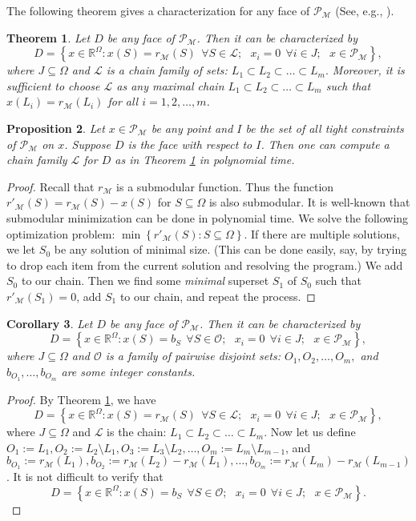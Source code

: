 \documentclass[a4paper,11pt]{article}
\newtheorem{theorem}{Theorem}[section]
\newtheorem{proposition}[theorem]{Proposition}
\newtheorem{corollary}[theorem]{Corollary}
\newcommand{\M}{\mathcal{M}}
\renewcommand{\O}{\mathcal{O}}
\renewcommand{\L}{\mathcal{L}}
\renewcommand{\P}{\mathcal{P}}
\begin{document}
The following theorem gives a characterization for any face of $\P_\M$ (See, e.g., \cite{schrijver, Lau2001}). 
\begin{theorem}
Let $D$ be any face of $\P_\M$. Then it can be characterized by
$$ D = \left\{x \in \mathbb{R}^{\Omega}: x(S) = r_\M(S)~~\forall S \in \L; ~~~ x_i = 0 ~~\forall i \in J; ~~~ x \in \P_\M  \right\},$$
where $J \subseteq \Omega$ and $\L$ is a chain family of sets:
$L_1 \subset L_2 \subset \ldots \subset L_m.$ Moreover, it is sufficient to choose $\L$ as any maximal chain $L_1 \subset L_2 \subset \ldots \subset L_m$ such that $x(L_i) = r_\M(L_i)$ for all $i = 1, 2, \ldots, m$.
\label{theorem:decompose_face}
\end{theorem}


\begin{proposition} Let $x \in \P_\M$ be any point and $I$ be the set of all tight constraints of $\P_\M$ on $x$. Suppose $D$ is the face with respect to $I$. Then one can compute a chain family $\L$ for $D$ as in Theorem \ref{theorem:decompose_face} in polynomial time.
\label{prop:decompose_face}
\end{proposition}
\begin{proof} Recall that $r_\M$ is a submodular function. Thus the function $r'_\M(S) = r_\M(S) - x(S)$ for $S \subseteq \Omega$ is also submodular. It is well-known that submodular minimization can be done in polynomial time. We solve the following optimization problem: $\min\left\{r'_\M(S): S \subseteq \Omega \right\}$. If there are multiple solutions, we let $S_0$ be any solution of minimal size. (This can be done easily, say, by trying to drop each item from the current solution and resolving the program.) We add $S_0$ to our chain. Then we find some \emph{minimal} superset $S_1$ of $S_0$ such that $r'_\M(S_1) = 0$, add $S_1$ to our chain, and repeat the process.
\end{proof}

\begin{corollary} Let $D$ be any face of $\P_\M$. Then it can be characterized by
$$ D = \left\{x \in \mathbb{R}^{\Omega}: x(S) = b_S~~\forall S \in \O; ~~~ x_i = 0 ~~\forall i \in J; ~~~ x \in \P_\M  \right\},$$
where $J \subseteq \Omega$ and $\O$ is a family of pairwise disjoint sets:
$O_1, O_2, \ldots, O_m,$ and $b_{O_1}, \ldots, b_{O_m}$ are some integer constants. 
\label{cor:decompose_face}
\end{corollary}
\begin{proof}
By Theorem \ref{theorem:decompose_face}, we have
$$ D = \left\{x \in \mathbb{R}^{\Omega}: x(S) = r_\M(S)~~\forall S \in \L; ~~~ x_i = 0 ~~\forall i \in J; ~~~ x \in \P_\M  \right\},$$
where $J \subseteq \Omega$ and $\L$ is the chain: $L_1 \subset L_2 \subset \ldots \subset L_m$. Now let us define $O_1 := L_1, O_2 := L_2 \setminus L_1, O_3 := L_3 \setminus L_2, \ldots, O_m := L_m \setminus L_{m-1}$, and $b_{O_1} := r_\M(L_1), b_{O_2} := r_\M(L_2) - r_\M(L_1), \ldots,  b_{O_m} := r_\M(L_m) - r_\M(L_{m-1})$. It is not difficult to verify that
$$ D = \left\{x \in \mathbb{R}^{\Omega}: x(S) = b_S~~\forall S \in \O; ~~~ x_i = 0 ~~\forall i \in J; ~~~ x \in \P_\M  \right\}.$$
\end{proof}
\end{document}
